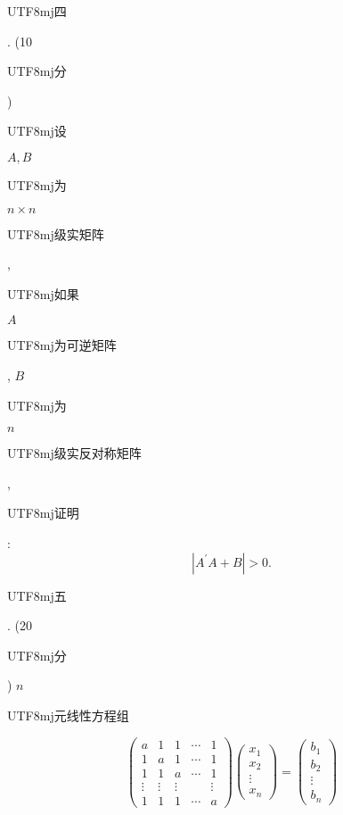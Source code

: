 \documentclass[10pt]{article}
\begin{document}
\begin{CJK}{UTF8}{mj}四\end{CJK}. (10 \begin{CJK}{UTF8}{mj}分\end{CJK}) \begin{CJK}{UTF8}{mj}设\end{CJK} $A, B$ \begin{CJK}{UTF8}{mj}为\end{CJK} $n \times n$ \begin{CJK}{UTF8}{mj}级实矩阵\end{CJK}, \begin{CJK}{UTF8}{mj}如果\end{CJK} $A$ \begin{CJK}{UTF8}{mj}为可逆矩阵\end{CJK}, $B$ \begin{CJK}{UTF8}{mj}为\end{CJK} $n$ \begin{CJK}{UTF8}{mj}级实反对称矩阵\end{CJK}, \begin{CJK}{UTF8}{mj}证明\end{CJK}:
$$
\left|A^{\prime} A+B\right|>0 .
$$
\begin{CJK}{UTF8}{mj}五\end{CJK}. (20 \begin{CJK}{UTF8}{mj}分\end{CJK}) $n$ \begin{CJK}{UTF8}{mj}元线性方程组\end{CJK}
$$
\left(\begin{array}{ccccc}
a & 1 & 1 & \cdots & 1 \\
1 & a & 1 & \cdots & 1 \\
1 & 1 & a & \cdots & 1 \\
\vdots & \vdots & \vdots & & \vdots \\
1 & 1 & 1 & \cdots & a
\end{array}\right)\left(\begin{array}{c}
x_{1} \\
x_{2} \\
\vdots \\
x_{n}
\end{array}\right)=\left(\begin{array}{c}
b_{1} \\
b_{2} \\
\vdots \\
b_{n}
\end{array}\right)
$$
\end{document}

